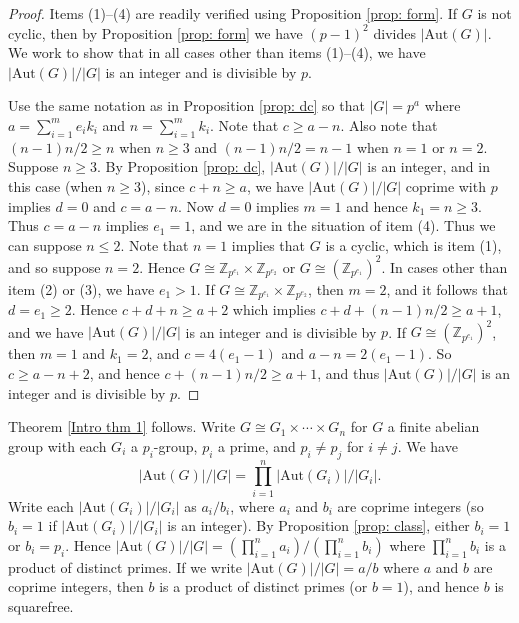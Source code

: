 \documentclass[12pt]{amsart}
\begin{document}
\begin{proof}
Items (1)--(4) are readily verified using Proposition \ref{prop: form}.  If $G$ is not cyclic, then by Proposition \ref{prop: form} we have $(p-1)^2$ divides $|\mathrm{Aut}(G)|$.  We work to show that in all cases other than items (1)--(4), we have $|\mathrm{Aut}(G)|/|G|$ is an integer and is divisible by $p$.

Use the same notation as in Proposition \ref{prop: dc} so that $|G| = p^a$ where $a = {\sum_{i=1}^m e_i k_i}$ and $n = {\sum_{i=1}^m k_i}$.  Note that $c \geq a-n$.  Also note that $(n-1)n/2 \geq n$ when $n \geq 3$ and $(n-1)n/2 = n-1$ when $n=1$ or $n=2$.  Suppose $n \geq 3$.  By Proposition \ref{prop: dc}, $|\mathrm{Aut}(G)|/|G|$ is an integer, and in this case (when $n \geq 3$), since $c + n \geq a$, we have $|\mathrm{Aut}(G)|/|G|$ coprime with $p$ implies $d=0$ and $c = a - n$.  Now $d=0$ implies $m=1$ and hence $k_1 = n \geq 3$.  Thus $c = a - n$ implies $e_1 = 1$, and we are in the situation of item (4).  Thus we can suppose $n \leq 2$.  Note that $n=1$ implies that $G$ is a cyclic, which is item (1), and so suppose $n=2$.  Hence $G \cong \mathbb{Z}_{p^{e_1}} \times \mathbb{Z}_{p^{e_2}}$ or $G \cong (\mathbb{Z}_{p^{e_1}})^2$.  In cases other than item (2) or (3), we have $e_1 > 1$.  If $G \cong \mathbb{Z}_{p^{e_1}} \times \mathbb{Z}_{p^{e_2}}$, then $m = 2$, and it follows that $d = e_1 \geq 2$.  Hence $c + d + n \geq a+2$ which implies $c + d + (n-1)n/2 \geq a+1$, and we have $|\mathrm{Aut}(G)|/|G|$ is an integer and is divisible by $p$.  If $G \cong (\mathbb{Z}_{p^{e_1}})^2$, then $m=1$ and $k_1=2$, and $c = 4(e_1-1)$ and $a-n = 2(e_1-1)$.  So $c \geq a-n + 2$, and hence $c + (n-1)n/2 \geq a+1$, and thus $|\mathrm{Aut}(G)|/|G|$ is an integer and is divisible by $p$. 
\end{proof}

Theorem \ref{Intro thm 1} follows.  Write $G \cong G_1 \times \cdots \times G_n$ for $G$ a finite abelian group with each $G_i$ a $p_i$-group, $p_i$ a prime, and $p_i \neq p_j$ for $i \neq j$.  We have $$|\mathrm{Aut}(G)|/|G| = \prod_{i=1}^n |\mathrm{Aut}(G_i)|/|G_i|.$$  Write each $|\mathrm{Aut}(G_i)|/|G_i|$ as $a_i/b_i$, where $a_i$ and $b_i$ are coprime integers (so $b_i=1$ if $|\mathrm{Aut}(G_i)|/|G_i|$ is an integer).  By Proposition \ref{prop: class}, either $b_i=1$ or $b_i=p_i$.  Hence $|\mathrm{Aut}(G)|/|G| = (\prod_{i=1}^n a_i)/(\prod_{i=1}^n b_i)$ where $\prod_{i=1}^n b_i$ is a product of distinct primes.  If we write $|\mathrm{Aut}(G)|/|G| = a/b$ where $a$ and $b$ are coprime integers, then $b$ is a product of distinct primes (or $b=1$), and hence $b$ is squarefree.
\end{document}
